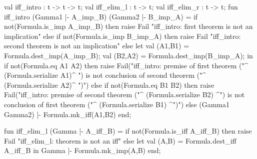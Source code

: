 \nwenddocs{}\plusendmoddef\nwstartdeflinemarkup{}\nwenddeflinemarkup
val iff_intro : t -> t -> t;
val iff_elim_l : t -> t;
val iff_elim_r : t -> t;
\nwendcode{}\nwdocspar
\nwenddocs{}\plusendmoddef\nwstartdeflinemarkup{}\nwenddeflinemarkup
fun iff_intro (Gamma1 |- A_imp_B) (Gamma2 |- B_imp_A) =
  if not(Formula.is_imp A_imp_B)
  then raise Fail "iff_intro: first theorem is not an implication"
  else if not(Formula.is_imp B_imp_A)
  then raise Fail "iff_intro: second theorem is not an implication"
  else let
    val (A1,B1) = Formula.dest_imp(A_imp_B);
    val (B2,A2) = Formula.dest_imp(B_imp_A);
  in
    if not(Formula.eq A1 A2)
    then raise Fail("iff_intro: premise of first theorem ("^
                    (Formula.serialize A1)^
                    ") is not conclusion of second theorem ("^
                    (Formula.serialize A2)^
                    ")")
    else if not(Formula.eq B1 B2)
    then raise Fail("iff_intro: premise of second theorem ("^
                    (Formula.serialize B2)
                    ^") is not conclusion of first theorem ("^
                    (Formula.serialize B1)
                    ^")")
    else (Gamma1  Gamma2) |- Formula.mk_iff(A1,B2)
  end;

fun iff_elim_l (Gamma |- A_iff_B) =
  if not(Formula.is_iff A_iff_B)
  then raise Fail "iff_elim_l: theorem is not an iff"
  else
    let val (A,B) = Formula.dest_iff A_iff_B
    in Gamma |- Formula.mk_imp(A,B) end;

